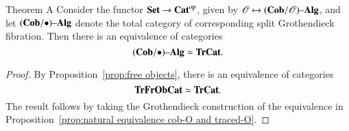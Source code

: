 \documentclass[12pt,oneside,article,draft]{memoir}
\begin{document}
\begin{enumerate}
%
%
%
\begin{named}{Theorem A}\label{thm:Theorem A}
	Consider the functor $\mathbf{Set}\to{\mathbf{Cat}}^{\text{op}}$, given by $\mathscr{O}\mapsto(\mathbf{Cob}/\mathscr{O}){\text \textendash}\mathbf{Alg}$, and let $(\mathbf{Cob}/\bullet){\text \textendash}\mathbf{Alg}$ denote the total category of corresponding split Grothendieck fibration.
	Then there is an equivalence of categories
		$$(\mathbf{Cob}/\bullet){\text \textendash}\mathbf{Alg}\simeq\mathbf{TrCat}.$$
\end{named}
\begin{proof}
	By Proposition~\ref{prop:free objects}, there is an equivalence of categories 
		$$\mathbf{TrFrObCat}\simeq\mathbf{TrCat}.$$ 
	The result follows by taking the Grothendieck construction of the equivalence in Proposition~\ref{prop:natural equivalence cob-O and traced-O}.
\end{proof}





\end{enumerate}
\end{document}
